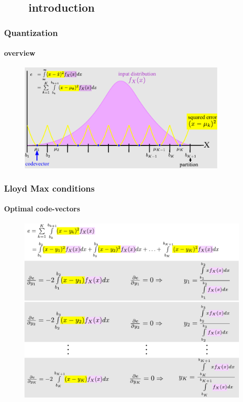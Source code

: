 \subsection{\ \ \ \ introduction}

\begin{frame}
\frametitle{Quantization}
\framesubtitle{overview}
\logoCSIPCPL\mypagenum
	\begin{figure}				
		\includegraphics[width=0.9\textwidth]{thesis/Quantization_MSE.pdf}
	\end{figure}
\end{frame}







\begin{frame}[plain]
\frametitle{Lloyd Max conditions}
\framesubtitle{Optimal code-vectors}
\logoCSIPCPL\mypagenum
	\begin{changemargin}{-1.3in}{0in}
		\begin{figure}				
			\includegraphics[height=0.8\textheight]{thesis/Quantization_optimalCodevectors.pdf}
		\end{figure}
	\end{changemargin}
\end{frame}



